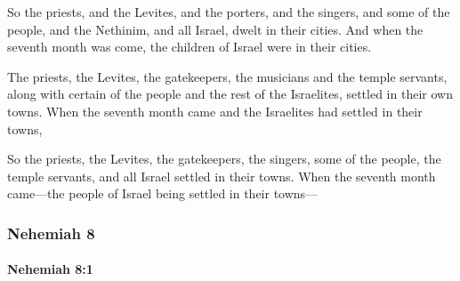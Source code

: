 			\begin{versebox}
					\item[BHS] 
					\item[LXX] 
					\item[ASV] So the priests, and the Levites, and the porters, and the singers, and some of the people, and the Nethinim, and all Israel, dwelt in their cities. And when the seventh month was come, the children of Israel were in their cities.
					\item[NIV] The priests, the Levites, the gatekeepers, the musicians and the temple servants, along with certain of the people and the rest of the Israelites, settled in their own towns. When the seventh month came and the Israelites had settled in their towns,
					\item[NRSV] So the priests, the Levites, the gatekeepers, the singers, some of the people, the temple servants, and all Israel settled in their towns. When the seventh month came—the people of Israel being settled in their towns—
			\end{versebox}
	\subsubsection{Nehemiah 8} %
		\label{NEHEMIAH-8}

		\paragraph{Nehemiah 8:1} %
			\label{NEHEMIAH-8-1}

